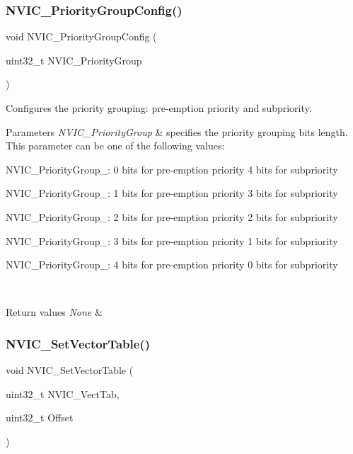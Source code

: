 \subsubsection{\texorpdfstring{NVIC\_PriorityGroupConfig()}{NVIC\_PriorityGroupConfig()}}
{\footnotesize\ttfamily void N\+V\+I\+C\+\_\+\+Priority\+Group\+Config (\begin{DoxyParamCaption}\item[{uint32\+\_\+t}]{N\+V\+I\+C\+\_\+\+Priority\+Group }\end{DoxyParamCaption})}



Configures the priority grouping\+: pre-\/emption priority and subpriority. 


\begin{DoxyParams}{Parameters}
{\em N\+V\+I\+C\+\_\+\+Priority\+Group} & specifies the priority grouping bits length. This parameter can be one of the following values\+: \begin{DoxyItemize}
\item N\+V\+I\+C\+\_\+\+Priority\+Group\+\_\+: 0 bits for pre-\/emption priority 4 bits for subpriority \item N\+V\+I\+C\+\_\+\+Priority\+Group\+\_\+: 1 bits for pre-\/emption priority 3 bits for subpriority \item N\+V\+I\+C\+\_\+\+Priority\+Group\+\_\+: 2 bits for pre-\/emption priority 2 bits for subpriority \item N\+V\+I\+C\+\_\+\+Priority\+Group\+\_\+: 3 bits for pre-\/emption priority 1 bits for subpriority \item N\+V\+I\+C\+\_\+\+Priority\+Group\+\_\+: 4 bits for pre-\/emption priority 0 bits for subpriority \end{DoxyItemize}
\\
\hline
\end{DoxyParams}

\begin{DoxyRetVals}{Return values}
{\em None} & \\
\hline
\end{DoxyRetVals}
\mbox{\label{group___m_i_s_c___exported___functions_ga1145208ad70edfc2fab19b8b8ef1b1a1}} 
\subsubsection{\texorpdfstring{NVIC\_SetVectorTable()}{NVIC\_SetVectorTable()}}
{\footnotesize\ttfamily void N\+V\+I\+C\+\_\+\+Set\+Vector\+Table (\begin{DoxyParamCaption}\item[{uint32\+\_\+t}]{N\+V\+I\+C\+\_\+\+Vect\+Tab,  }\item[{uint32\+\_\+t}]{Offset }\end{DoxyParamCaption})}



